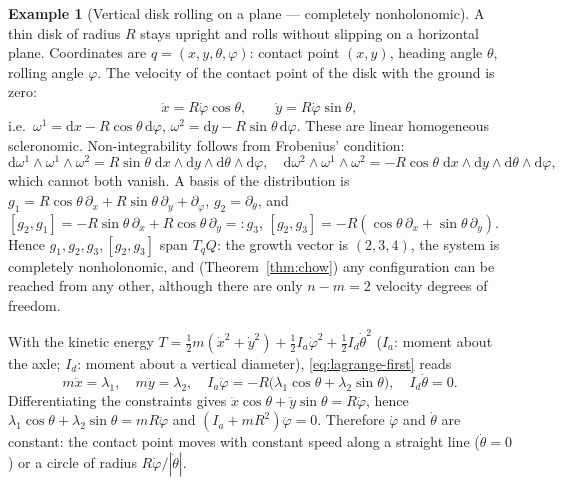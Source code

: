 \documentclass[11pt,a4paper]{article}
\theoremstyle{definition}
\newtheorem{example}{Example}[section]
\theoremstyle{plain}
\theoremstyle{remark}
\newcommand{\dd}{\mathrm{d}}
\begin{document}
\begin{example}[Vertical disk rolling on a plane --- completely nonholonomic]\label{ex:disk}
A thin disk of radius $R$ stays upright and rolls without slipping on a horizontal plane. Coordinates
are $q=(x,y,\theta,\varphi)$: contact point $(x,y)$, heading angle $\theta$, rolling
angle $\varphi$. The velocity of the contact point of the disk with the ground is zero:
\[
  \dot x=R\dot\varphi\cos\theta,\qquad \dot y=R\dot\varphi\sin\theta,
\]
i.e.\ $\omega^1=\dd x-R\cos\theta\,\dd\varphi$, $\omega^2=\dd y-R\sin\theta\,\dd\varphi$.
These are linear homogeneous scleronomic. Non-integrability follows from Frobenius' condition:
\[
  \dd\omega^1\wedge\omega^1\wedge\omega^2=R\sin\theta\;\dd x\wedge\dd y\wedge\dd\theta\wedge\dd\varphi,\quad
  \dd\omega^2\wedge\omega^1\wedge\omega^2=-R\cos\theta\;\dd x\wedge\dd y\wedge\dd\theta\wedge\dd\varphi,
\]
which cannot both vanish. A basis of the distribution is
$g_1=R\cos\theta\,\partial_x+R\sin\theta\,\partial_y+\partial_\varphi$, $g_2=\partial_\theta$, and
$[g_2,g_1]=-R\sin\theta\,\partial_x+R\cos\theta\,\partial_y=:g_3$,
$[g_2,g_3]=-R(\cos\theta\,\partial_x+\sin\theta\,\partial_y)$. Hence $g_1,g_2,g_3,[g_2,g_3]$ span
$T_qQ$: the growth vector is $(2,3,4)$, the system is completely nonholonomic, and
(Theorem~\ref{thm:chow}) any configuration can be reached from any other, although there are
only $n-m=2$ velocity degrees of freedom.

With the kinetic energy $T=\tfrac12m(\dot x^2+\dot y^2)+\tfrac12I_a\dot\varphi^2+\tfrac12I_d\dot\theta^2$ ($I_a$: moment about
the axle; $I_d$: moment about a vertical diameter), \eqref{eq:lagrange-first} reads
\[
  m\ddot x=\lambda_1,\quad m\ddot y=\lambda_2,\quad
  I_a\ddot\varphi=-R\bigl(\lambda_1\cos\theta+\lambda_2\sin\theta\bigr),\quad I_d\ddot\theta=0 .
\]
Differentiating the constraints gives $\ddot x\cos\theta+\ddot y\sin\theta=R\ddot\varphi$, hence
$\lambda_1\cos\theta+\lambda_2\sin\theta=mR\ddot\varphi$ and $(I_a+mR^2)\ddot\varphi=0$. Therefore
$\dot\varphi$ and $\dot\theta$ are constant: the contact point moves with constant speed
along a straight line ($\dot\theta=0$) or a circle of radius $R\dot\varphi/|\dot\theta|$.
\end{example}
\end{document}
